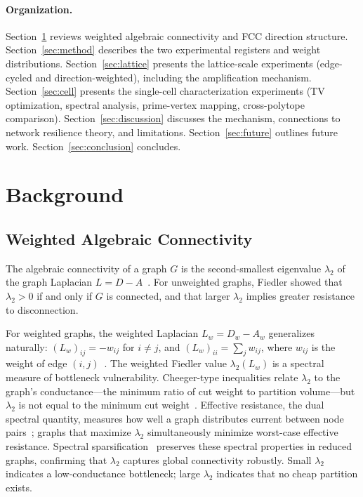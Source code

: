 \documentclass[11pt]{article}
\begin{document}
\paragraph{Organization.}
Section~\ref{sec:background} reviews weighted algebraic connectivity
and FCC direction structure. Section~\ref{sec:method} describes the
two experimental registers and weight distributions.
Section~\ref{sec:lattice} presents the lattice-scale experiments
(edge-cycled and direction-weighted), including the amplification
mechanism. Section~\ref{sec:cell} presents the single-cell
characterization experiments (TV optimization, spectral analysis,
prime-vertex mapping, cross-polytope comparison).
Section~\ref{sec:discussion} discusses the mechanism, connections to
network resilience theory, and limitations.
Section~\ref{sec:future} outlines future work.
Section~\ref{sec:conclusion} concludes.

\section{Background}
\label{sec:background}

\subsection{Weighted Algebraic Connectivity}

The algebraic connectivity of a graph $G$ is the second-smallest
eigenvalue $\lambda_2$ of the graph Laplacian
$L = D - A$~\cite{fiedler1973}. For unweighted graphs, Fiedler
showed that $\lambda_2 > 0$ if and only if $G$ is connected, and
that larger $\lambda_2$ implies greater resistance to
disconnection.

For weighted graphs, the weighted Laplacian
$L_w = D_w - A_w$ generalizes naturally: $(L_w)_{ij} = -w_{ij}$
for $i \neq j$, and $(L_w)_{ii} = \sum_j w_{ij}$, where $w_{ij}$
is the weight of edge $(i,j)$~\cite{mohar1991, chung1997}. The
weighted Fiedler value $\lambda_2(L_w)$ is a spectral measure of
bottleneck vulnerability. Cheeger-type inequalities relate
$\lambda_2$ to the graph's conductance---the minimum ratio of cut
weight to partition volume---but $\lambda_2$ is not equal to the
minimum cut weight~\cite{mohar1991, chung1997}. Effective
resistance, the dual spectral quantity, measures how well a graph
distributes current between node
pairs~\cite{ghosh2008resistance}; graphs that maximize
$\lambda_2$ simultaneously minimize worst-case effective
resistance. Spectral sparsification~\cite{spielman2004} preserves
these spectral properties in reduced graphs, confirming that
$\lambda_2$ captures global connectivity robustly. Small
$\lambda_2$ indicates a low-conductance bottleneck; large
$\lambda_2$ indicates that no cheap partition exists.
\end{document}
